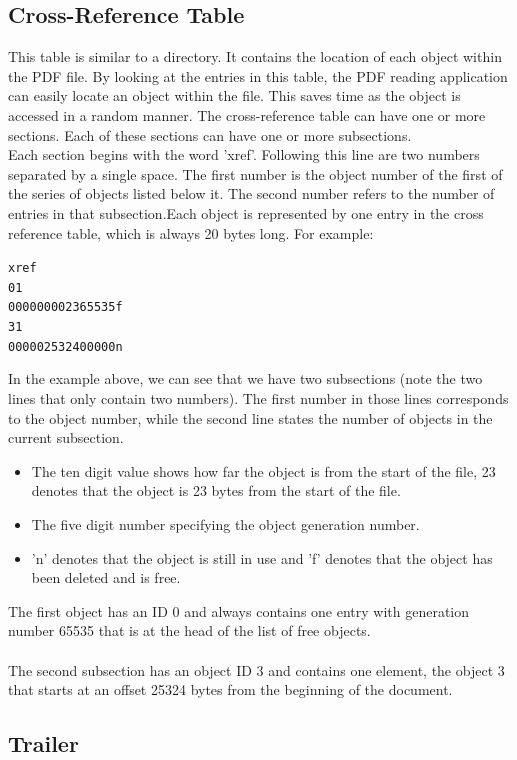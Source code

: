 \subsection{Cross-Reference Table}

This table is similar to a directory. It contains the location of each object within the PDF file. By looking at the entries in this table, the PDF reading application can easily locate an object within the file. This saves time as the object is accessed in a random manner. The cross-reference table can have one or more sections. Each of these sections can have one or more subsections.\\
Each section begins with the word 'xref'. Following this line are two numbers separated by a single space. The first number is the object number of the first of the series of objects listed below it. The second number refers to the number of entries in that subsection.Each object is represented by one entry in the cross reference table, which is always 20 bytes long. For example:
\begin{alltt}
		xref
		0 1
		0000000023 65535 f
		3 1
		0000025324 00000 n
\end{alltt}

In the example above, we can see that we have two subsections (note the two lines that only contain two numbers). The first number in those lines corresponds to the object number, while the second line states the number of objects in the current subsection.

\begin{itemize}
	\item The ten digit value shows how far the object is from the start of the file, 23 denotes that the object is 23 bytes from the start of the file.
	\item The five digit number specifying the object generation number.
	\item 'n' denotes that the object is still in use and 'f' denotes that the object has been deleted and is free.
\end{itemize}
The first object has an ID 0 and always contains one entry with generation number 65535 that is at the head of the list of free objects.\\
\\
The second subsection has an object ID 3 and contains one element, the object 3 that starts at an offset 25324 bytes from the beginning of the document.

\subsection{Trailer}

